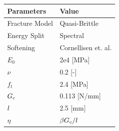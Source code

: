 \documentclass[11pt]{article}
\begin{document}
\begin{figure}[ht]
\begin{minipage}[b]{0.45\linewidth}
\begin{tabular}{ll}
  \textbf{Parameters}  & \textbf{Value} \\ \hline
  Fracture Model & Quasi-Brittle \\
  Energy Split & Spectral \\
  Softening & Cornellisen et. al. \cite{cornelissen1986experimental} \\
  $E_0$  & 2e4 [MPa] \\
  $\nu$  & 0.2 [-] \\
  $f_t$  & 2.4 [MPa] \\
  $\hbox{$G_c$}$  & 0.113 [N/mm] \\
  $\hbox{$l$}$  & 2.5 [mm] \\
  $\eta$ & $\beta \hbox{$G_c$}/\hbox{$l$}$ \\ \hline
  \end{tabular}
\label{sec4:table:3pt_bending}
\end{minipage}
\end{figure}
\end{document}
